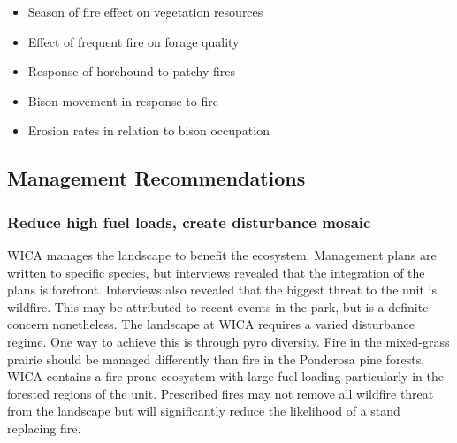 \begin{itemize}
\item Season of fire effect on vegetation resources
\item Effect of frequent fire on forage quality
\item Response of horehound to patchy fires
\item Bison movement in response to fire
\item Erosion rates in relation to bison occupation
\end{itemize}

\subsection{Management Recommendations}

\subsubsection{Reduce high fuel loads, create disturbance mosaic}

WICA manages the landscape to benefit the ecosystem. Management plans
are written to specific species, but interviews revealed that the
integration of the plans is forefront. Interviews also revealed that the
biggest threat to the unit is wildfire. This may be attributed to recent
events in the park, but is a definite concern nonetheless. The landscape
at WICA requires a varied disturbance regime. One way to achieve this is
through pyro diversity. Fire in the mixed-grass prairie should be
managed differently than fire in the Ponderosa pine forests. WICA
contains a fire prone ecosystem with large fuel loading particularly in
the forested regions of the unit. Prescribed fires may not remove all
wildfire threat from the landscape but will significantly reduce the
likelihood of a stand replacing fire.
